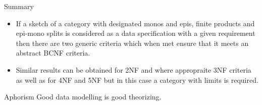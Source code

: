 \begin{frame}{Summary}
\begin{itemize}
\item If a sketch of a category with designated monos and epis, finite products and epi-mono splits is
 considered as a data specification with a given requirement then there are  two generic criteria which when met
 ensure that it meets an abstract BCNF criteria.
\item Similar results can be obtained for 2NF and where appropraite 3NF criteria as well as for 4NF and 5NF but in this case a category with limits is required.
\end{itemize}
\end{frame}

\begin{frame}{Aphorism}
\Large Good data modelling is good theorizing.
\end{frame}

\iffalse

\subsection{Entity-Relationship Notation}


\subsection{Unused}

\fi

